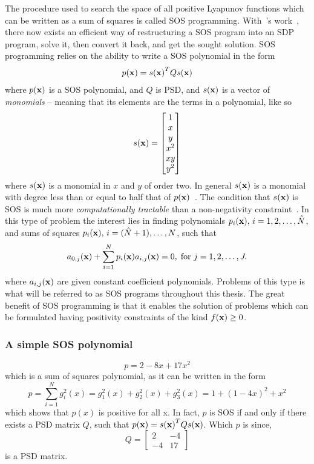 The procedure used to search the space of all positive Lyapunov functions which
can be written as a sum of squares is called \ac{SOS} programming.
With~\citeauthor{parilloStructuredSemidefinitePrograms}'s
work~\cite{parilloStructuredSemidefinitePrograms}, there now exists an efficient
way of restructuring a \ac{SOS} program into an \ac{SDP} program, solve it, then
convert it back, and get the sought solution. \ac{SOS} programming relies on the
ability to write a SOS polynomial in the form
\begin{align*}
  p(\mathbf{x}) &= s{(\mathbf{x})}^{T}Qs(\mathbf{x})\\
\end{align*}
where \(p(\mathbf{x})\) is a \ac{SOS} polynomial, and \(Q\) is \ac{PSD}, and
\(s(\mathbf{x})\) is a vector of \textit{monomials} -- meaning that its elements
are the terms in a polynomial, like so
\[
  s(\mathbf{x}) = \begin{bmatrix} 1 \\ x \\ y \\ x^2 \\ xy \\ y^2 \end{bmatrix}
\]
where \(s(\mathbf{x})\) is a monomial in \(x\) and \(y\) of order two. In general
\(s(\mathbf{x})\) is a monomial with degree less than or equal to half that of
\(p(\mathbf{x})\)~\cite{parilloStructuredSemidefinitePrograms}\label{monomialdegree}.
The condition that \(s(\mathbf{x})\) is \ac{SOS} is much more
\textit{computationally tractable} than a non-negativity
constraint~\cite{parilloStructuredSemidefinitePrograms}. In this type of problem
the interest lies in finding polynomials \(p_i(\mathbf{x}), \,
i=1,2,\ldots,\hat{N}\), and sums of squares \(p_i(\mathbf{x}), \,
i=(\hat{N}+1),\ldots,N\), such that
\[
  a_{0,j}(\mathbf{x}) + \sum_{i=1}^{N}p_{i}(\mathbf{x})a_{i,j}(\mathbf{x}) = 0, \;
  \text{for } j = 1,2,\ldots,J.
\]
where \(a_{i,j}(\mathbf{x})\) are given constant coefficient polynomials. Problems
of this type is what will be referred to as \ac{SOS} programs throughout this
thesis. The great benefit of \ac{SOS} programming is that it enables the
solution of problems which can be formulated having positivity constraints of
the kind \(f(\mathbf{x}) \geq 0\).

\subsubsection{A simple \ac{SOS} polynomial}
\[
  p = 2 - 8x + 17x^2
\]
which is a sum of squares polynomial, as it can be written in the form
\[
  p = \sum_{i=1}^{N}g_i^2(x) = g_1^2(x) + g_2^2(x) + g_3^2(x)= 1 + {(1-4x)}^2 +
  x^2
\]
which shows that \(p(x)\) is positive for all x. In fact, \(p\) is \ac{SOS} if
and only if there exists a \acl{PSD} matrix \(Q\), such that \(p(\mathbf{x}) =
s{(\mathbf{x})}^{T}Qs(\mathbf{x})\). Which \(p\) is since,
\[
  Q =
  \begin{bmatrix}
    2 & -4 \\
    -4 & 17
  \end{bmatrix}
\]
is a \acl{PSD} matrix.

